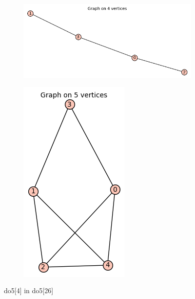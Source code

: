 \documentclass[12pt, a4paper]{article}
\begin{document}
\begin{center}
\begin{figure}
\centering
\begin{subfigure}{0.5\textwidth}
  \centering
  \includegraphics[width=0.6\linewidth]{do5[4]}
\end{subfigure}%
\begin{subfigure}{0.5\textwidth}
  \centering
  \includegraphics[width=0.4\linewidth]{do5[26]}
\end{subfigure}
\caption{do5[4] in do5[26]}
\label{fig:test}
\end{figure}


\end{center}
\end{document}
